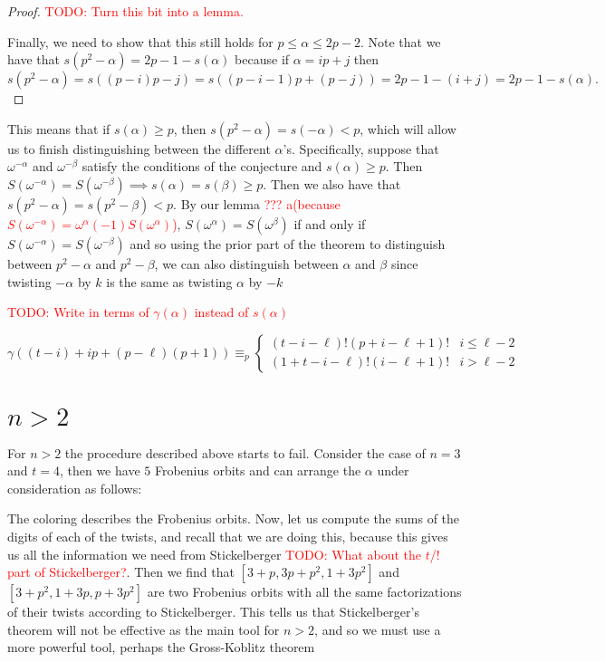 \documentclass[12pt]{article}
\theoremstyle{customtheorem}%
\theoremstyle{remark}
\theoremstyle{definition}
\numberwithin{equation}{section}
\numberwithin{theorem}{section}
\begin{document}
\begin{proof}
\textcolor{red}{TODO: Turn this bit into a lemma.}


Finally, we need to show that this still holds for $p \leq \alpha \leq 2p - 2$. 
Note that we have that $s(p^2 - \alpha) = 2p-1  - s(\alpha)$ because if $\alpha = ip+j$ then \[s(p^2 -\alpha) = s((p-i)p -j) = s((p -i - 1)p + (p-j) )= 2p-1 - (i+j) = 2p - 1 - s(\alpha).\]
\end{proof}

This means that if $s(\alpha) \geq p$, then $s(p^2 - \alpha) = s(-\alpha) < p$, which will allow us to finish distinguishing between the different $\alpha$'s. 
Specifically, suppose that $\omega^{-\alpha}$ and $\omega^{-\beta}$ satisfy the conditions of the conjecture and $s(\alpha) \geq p$. 
Then $S(\omega^{-\alpha}) = S(\omega^{-\beta}) \implies s(\alpha) = s(\beta) \geq p$. 
Then we also have that $s(p^2 - \alpha) = s(p^2 - \beta) < p$. 
By our lemma \textcolor{red}{??? a(because $S(\omega^{-\alpha}) = \omega^{\alpha}(-1)S(\omega^{\alpha})$)}, $S(\omega^\alpha) = S(\omega^\beta)$ if and only if $S(\omega^{-\alpha}) = S(\omega^{-\beta})$ and so using the prior part of the theorem to distinguish between $p^2 - \alpha$ and $p^2 - \beta$, we can also distinguish between $\alpha$ and $\beta$ since twisting $-\alpha$ by $k$ is the same as twisting $\alpha$ by $-k$ 

\textcolor{red}{TODO: Write in terms of $\gamma(\alpha)$ instead of $s(\alpha)$}

\[ \gamma((t-i)+ip + (p - \ell)(p+1)) \equiv_p \begin{cases} (t-i-\ell)!(p+i-\ell+1)! & i \leq \ell -2 \\ (1+t-i-\ell)!(i-\ell+1)!& i > \ell -2 \end{cases}\]

\section{$n>2$}

For $n > 2$ the procedure described above starts to fail. 
Consider the case of $n = 3$ and $t = 4$, then we have $5$ Frobenius orbits and can arrange the $\alpha$ under consideration as follows:

The coloring describes the Frobenius orbits. 
Now, let us compute the sums of the digits of each of the twists, and recall that we are doing this, because this gives us all the information we need from Stickelberger \textcolor{red}{TODO: What about the $t$/$!$ part of Stickelberger?}. 
Then we find that $[3+p,3p+p^2,1+3p^2]$ and $[3+p^2, 1+3p, p+3p^2]$ are two Frobenius orbits with all the same factorizations of their twists according to Stickelberger. 
This tells us that Stickelberger's theorem will not be effective as the main tool for $n > 2$, and so we must use a more powerful tool, perhaps the Gross-Koblitz theorem

%
%
\end{document}

